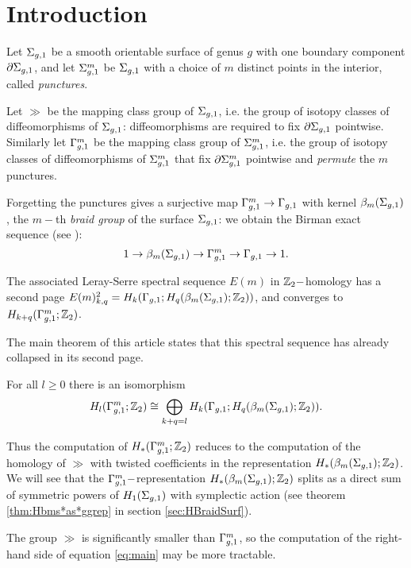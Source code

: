 \section{Introduction}
Let $\Sigma_{g,1}$ be a smooth orientable surface of genus $g$ with one boundary component $\partial\Sigma_{g,1}$, and let $\Sigma_{g,1}^m$ be $\Sigma_{g,1}$ with
a choice of $m$ distinct points in the interior, called \emph{punctures}.

Let $\gg$ be the mapping class group of $\Sigma_{g,1}$, i.e. the group of isotopy classes of diffeomorphisms of $\Sigma_{g,1}$:
diffeomorphisms are required to fix $\partial\Sigma_{g,1}$ pointwise. Similarly let $\Gamma_{g,1}^m$ be the mapping class group of $\Sigma_{g,1}^m$, i.e.
the group of isotopy classes of diffeomorphisms of $\Sigma_{g,1}^m$ that fix $\partial\Sigma_{g,1}^m$ pointwise and \emph{permute} the $m$ punctures.

Forgetting the punctures gives a surjective map $\Gamma_{g,1}^m\to\Gamma_{g,1}$ with kernel $\beta_{m}(\Sigma_{g,1})$,
the $m-$th \emph{braid group} of the surface $\Sigma_{g,1}$: we obtain the Birman exact sequence (see \cite{Birman:mcgbr}):
\begin{equation}
\label{eq:Birman}
1\to\beta_{m}(\Sigma_{g,1})\to\Gamma_{g,1}^m\to\Gamma_{g,1}\to 1.
\end{equation}

The associated Leray-Serre spectral sequence $E(m)$ in $\mathbb{Z}_2-$homology has a second page $E(m)^2_{k,q}=H_k(\Gamma_{g,1};H_q(\beta_{m}(\Sigma_{g,1});\mathbb{Z}_2))$,
and converges to $H_{k+q}(\Gamma_{g,1}^m;\mathbb{Z}_2)$.

The main theorem of this article states that this spectral sequence has already collapsed in its second page.
\begin{thm}
\label{thm:main}
For all $l\geq 0$ there is an isomorphism
\begin{equation}
\label{eq:main}
H_l(\Gamma_{g,1}^m;\mathbb{Z}_2)\cong \bigoplus_{k+q=l} H_k(\Gamma_{g,1};H_q(\beta_{m}(\Sigma_{g,1});\mathbb{Z}_2)).
\end{equation}
\end{thm}
Thus the computation of $H_*(\Gamma_{g,1}^m;\mathbb{Z}_2)$ reduces to the computation of the homology of $\gg$ with
twisted coefficients in the representation $H_*(\beta_{m}(\Sigma_{g,1});\mathbb{Z}_2)$. We will see that the $\Gamma_{g,1}^m-$representation
$H_*(\beta_{m}(\Sigma_{g,1});\mathbb{Z}_2)$ splits as a direct sum of symmetric powers of $H_1(\Sigma_{g,1})$ with symplectic action
(see theorem \ref{thm:Hbms*as*ggrep} in section \ref{sec:HBraidSurf}).


The group $\gg$ is significantly smaller than $\Gamma_{g,1}^m$, so the
computation of the right-hand side of equation \ref{eq:main}
may be more tractable.
